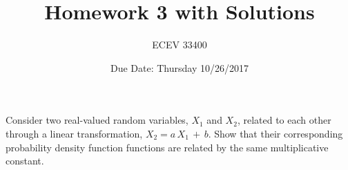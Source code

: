 \documentclass{article}
\newenvironment{problem}[2][Problem]{\begin{trivlist}
\item[\hskip \labelsep {\bfseries #1}\hskip \labelsep {\bfseries #2.}]}{\end{trivlist}}
\begin{document}

\title{Homework 3 with Solutions} %
\author{ECEV 33400} %
\date{Due Date: Thursday 10/26/2017} %

\maketitle


\begin{problem}{1}
 	\item Consider two real-valued random variables, $X_1$ and $X_2$, related to each other through a linear transformation, $X_2 = a\,X_1\,+\,b$. Show that their corresponding probability density function functions are related by the same multiplicative constant.  
\end{problem}
\end{document}
